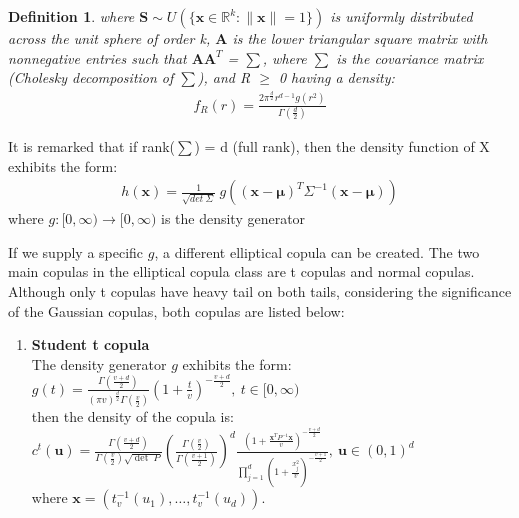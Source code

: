 \documentclass[12pt]{report}
\newtheorem{definition}{Definition}[subsection]
\newcommand{\1}{\mathbf{1}}
\begin{document}
\begin{flushleft}
\begin{definition}
where $\textbf{S} \sim U( \{ \textbf{x} \in \mathbb{R}^{k} : \|\textbf{x}\| = 1 \} )$ is uniformly distributed across the unit sphere of order k, $\textbf{A}$ is the lower triangular square matrix with nonnegative entries such that $\textbf{A}\textbf{A}^{T}$ = $\sum$, where $\sum$ is the covariance matrix (Cholesky decomposition of $\sum$), and R $\ge$ 0 having a density:
\begin{align*}
f_{R}(r) = \frac{2 \pi^{\frac{d}{2}} r^{d-1} g(r^{2})}{\Gamma(\frac{d}{2})}
\end{align*}
\end{definition}

It is remarked that if rank($\sum$) = d (full rank), then the density function of X exhibits the form: \\

\begin{align*}
h(\textbf{x}) = \frac{1}{\sqrt{det \: \Sigma}} \: g \left( (\textbf{x} - \boldsymbol{\mu})^{T} \Sigma^{-1} (\textbf{x} - \boldsymbol{\mu})  \right)
\end{align*}
where $g : [0,\infty) \rightarrow [0,\infty)$ is the density generator

If we supply a specific $g$, a different elliptical copula can be created. The two main copulas in the elliptical copula class are t copulas and normal copulas. Although only t copulas have heavy tail on both tails, considering the significance of the Gaussian copulas, both copulas are listed below: \\

\begin{enumerate}
\item \textbf{Student t copula} \textit{\normalfont\parencite{HofertBook}} \\

The density generator $g$ exhibits the form:\\
\vspace{0.5cm}
$g(t) = \frac{\Gamma(\frac{v+d}{2})}{(\pi v)^{\frac{d}{2}}\Gamma(\frac{v}{2})} \left( 1+\frac{t}{v} \right) ^{-\frac{v+d}{2}}, \: t \in [0,\infty)$ \\
\vspace{0.5cm}
then the density of the copula is:\\
\vspace{0.5cm}
$ c^{t}(\textbf{u}) = \frac{\Gamma(\frac{v+d}{2})}{\Gamma(\frac{v}{2})\sqrt{\det \: P}} \left( \frac{\Gamma(\frac{v}{2})}{\Gamma(\frac{v+1}{2})} \right)^{d} \frac{ (1 + \frac{\textbf{x}^{T}P^{-1}\textbf{x}}{v})^{-\frac{v+d}{2}}}{\prod_{j = 1}^{d} (1 + \frac{x_{j}^{2}}{v})^{-\frac{v+1}{2}}} , \: \textbf{u} \in (0,1)^{d}$ \\
\vspace{0.5cm}
where $\textbf{x} = (t^{-1}_{v}(u_{1}), \dots, t^{-1}_{v}(u_{d}))$.\\


\end{enumerate}
\end{flushleft}
\end{document}
